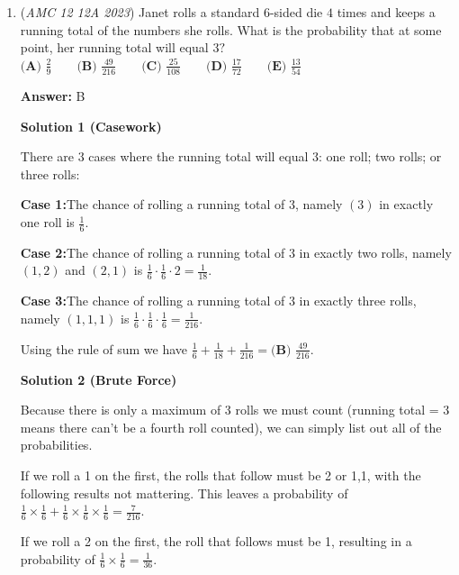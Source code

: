 \begin{enumerate}
All the exponents have a common factor of $5$ which we can factor out. This leaves us with $(8 \cdot 5^2 \cdot 15)^5 = (3000)^5 = (3 \cdot 1000)^5$. We can then distribute the power leaving us with $3^5 \cdot 10^{3 \cdot 5} = 243 \cdot 10^{15}$. This would be $243$ followed by $15$ zeros resulting in our answer being $15+3=\text{\boxed{\textbf{(E)}18}}$~leon\_0iler

 


	\item (\textit{AMC 12 12A 2023}) Janet rolls a standard $6$-sided die $4$ times and keeps a running total of the numbers she rolls. What is the probability that at some point, her running total will equal $3?$
$\textbf{(A) }\frac{2}{9}\qquad\textbf{(B) }\frac{49}{216}\qquad\textbf{(C) }\frac{25}{108}\qquad\textbf{(D) }\frac{17}{72}\qquad\textbf{(E) }\frac{13}{54}$

 \textbf{Answer: }B



\textbf{Solution 1 (Casework)}

There are $3$ cases where the running total will equal $3$: one roll; two rolls; or three rolls:

 \textbf{Case 1:}The chance of rolling a running total of $3$, namely $(3)$ in exactly one roll is $\frac{1}{6}$.

 \textbf{Case 2:}The chance of rolling a running total of $3$ in exactly two rolls, namely $(1, 2)$ and $(2, 1)$ is $\frac{1}{6}\cdot\frac{1}{6}\cdot2=\frac{1}{18}$.

 \textbf{Case 3:}The chance of rolling a running total of 3 in exactly three rolls, namely $(1, 1, 1)$ is $\frac{1}{6}\cdot\frac{1}{6}\cdot\frac{1}{6}=\frac{1}{216}$.

 Using the rule of sum we have $\frac{1}{6}+\frac{1}{18}+\frac{1}{216}=\boxed{\textbf{(B) }\frac{49}{216}}$.

 



\textbf{Solution 2 (Brute Force)}

Because there is only a maximum of 3 rolls we must count (running total = 3 means there can't be a fourth roll counted), we can simply list out all of the probabilities.

 If we roll a 1 on the first, the rolls that follow must be 2 or {1,1}, with the following results not mattering. This leaves a probability of $\frac{1}{6}\times\frac{1}{6} + \frac{1}{6}\times\frac{1}{6}\times\frac{1}{6} = \frac{7}{216}$.

 If we roll a 2 on the first, the roll that follows must be 1, resulting in a probability of $\frac{1}{6}\times\frac{1}{6} = \frac{1}{36}$.


\end{enumerate}

